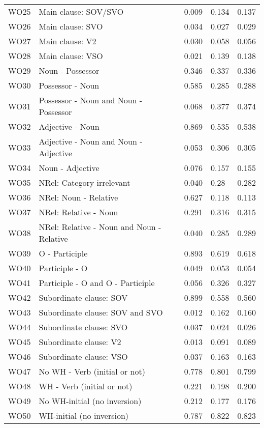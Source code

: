 \begin{longtable}{lllll}
WO25 & Main clause: SOV/SVO & 0.009 & 0.134 & 0.137\\
WO26 & Main clause: SVO & 0.034 & 0.027 & 0.029\\
WO27 & Main clause: V2 & 0.030 & 0.058 & 0.056\\
WO28 & Main clause: VSO & 0.021 & 0.139 & 0.138\\
WO29 & Noun - Possessor & 0.346 & 0.337 & 0.336\\
WO30 & Possessor - Noun & 0.585 & 0.285 & 0.288\\
WO31 & Possessor - Noun and Noun - Possessor & 0.068 & 0.377 & 0.374\\
WO32 & Adjective - Noun & 0.869 & 0.535 & 0.538\\
WO33 & Adjective - Noun and Noun - Adjective & 0.053 & 0.306 & 0.305\\
WO34 & Noun - Adjective & 0.076 & 0.157 & 0.155\\
WO35 & NRel: Category irrelevant & 0.040 & 0.28 & 0.282\\
WO36 & NRel: Noun - Relative & 0.627 & 0.118 & 0.113\\
WO37 & NRel: Relative - Noun & 0.291 & 0.316 & 0.315\\
WO38 & NRel: Relative - Noun and Noun - Relative & 0.040 & 0.285 & 0.289\\
WO39 & O - Participle & 0.893 & 0.619 & 0.618\\
WO40 & Participle - O & 0.049 & 0.053 & 0.054\\
WO41 & Participle - O and O - Participle & 0.056 & 0.326 & 0.327\\
WO42 & Subordinate clause: SOV & 0.899 & 0.558 & 0.560\\
WO43 & Subordinate clause: SOV and SVO & 0.012 & 0.162 & 0.160\\
WO44 & Subordinate clause: SVO & 0.037 & 0.024 & 0.026\\
WO45 & Subordinate clause: V2 & 0.013 & 0.091 & 0.089\\
WO46 & Subordinate clause: VSO & 0.037 & 0.163 & 0.163\\
WO47 & No WH - Verb (initial or not) & 0.778 & 0.801 & 0.799\\
WO48 & WH - Verb (initial or not) & 0.221 & 0.198 & 0.200\\
WO49 & No WH-initial (no inversion) & 0.212 & 0.177 & 0.176\\
WO50 & WH-initial (no inversion) & 0.787 & 0.822 & 0.823\\
\bottomrule
\end{longtable}
